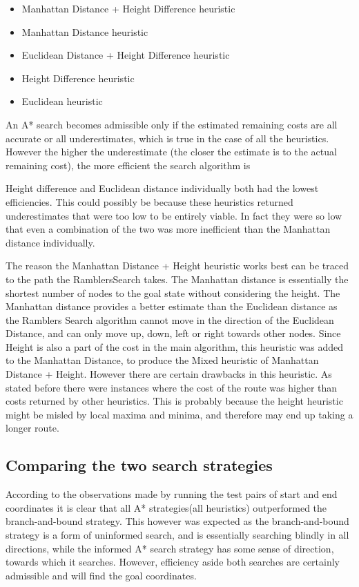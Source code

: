 \documentclass[11pt,oneside]{article}
\begin{document}
\begin{itemize}
    \item Manhattan Distance + Height Difference heuristic
    \item Manhattan Distance heuristic
    \item Euclidean Distance + Height Difference heuristic
    \item Height Difference heuristic
    \item Euclidean heuristic
\end{itemize}

An A* search becomes admissible only if the estimated remaining costs are all accurate or all underestimates, which is true in the case of all the heuristics. However the higher the underestimate (the closer the estimate is to the actual remaining cost), the more efficient the search algorithm is

Height difference and Euclidean distance individually both had the lowest efficiencies. This could possibly be because these heuristics returned underestimates that were too low to be entirely viable. In fact they were so low that even a combination of the two was more inefficient than the Manhattan distance individually.

The reason the Manhattan Distance + Height heuristic works best can be traced to the path the RamblersSearch takes. The Manhattan distance is essentially the shortest number of nodes to the goal state without considering the height. The Manhattan distance provides a better estimate than the Euclidean distance as the Ramblers Search algorithm cannot move in the direction of the Euclidean Distance, and can only move up, down, left or right towards other nodes. Since Height is also a part of the cost in the main algorithm, this heuristic was added to the Manhattan Distance, to produce the Mixed heuristic of Manhattan Distance + Height. However there are certain drawbacks in this heuristic. As stated before there were instances where the cost of the route was higher than costs returned by other heuristics. This is probably because the height heuristic might be misled by local maxima and minima, and therefore may end up taking a longer route.

\subsection{Comparing the two search strategies}
According to the observations made by running the test pairs of start and end coordinates it is clear that all A* strategies(all heuristics) outperformed the branch-and-bound strategy. This however was expected as the branch-and-bound strategy is a form of uninformed search, and is essentially searching blindly in all directions, while the informed A* search strategy has some sense of direction, towards which it searches. However, efficiency aside both searches are certainly admissible and will find the goal coordinates.
\end{document}
